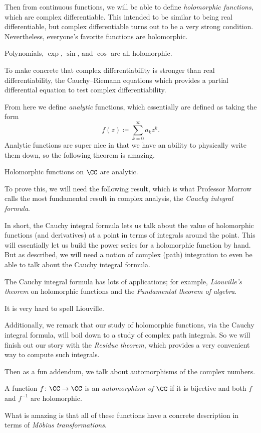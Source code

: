 \documentclass[../notes.tex]{subfiles}
\begin{document}
Then from continuous functions, we will be able to define \textit{holomorphic functions}, which are complex differentiable. This intended to be similar to being real differentiable, but complex differentiable turns out to be a very strong condition. Nevertheless, everyone's favorite functions are holomorphic.
\begin{example}
	Polynomials, $\exp$, $\sin$, and $\cos$ are all holomorphic.
\end{example}
To make concrete that complex differentiability is stronger than real differentiability, the Cauchy--Riemann equations which provides a partial differential equation to test complex differentiability.

From here we define \textit{analytic} functions, which essentially are defined as taking the form
\[f(z)\coloneqq \sum_{k=0}^\infty a_kz^k.\]
Analytic functions are super nice in that we have an ability to physically write them down, so the following theorem is amazing.
\begin{theorem}
	Holomorphic functions on $\CC$ are analytic.
\end{theorem}
To prove this, we will need the following result, which is what Professor Morrow calls the most fundamental result in complex analysis, the \textit{Cauchy integral formula}.

In short, the Cauchy integral formula lets us talk about the value of holomorphic functions (and derivatives) at a point in terms of integrals around the point. This will essentially let us build the power series for a holomorphic function by hand. But as described, we will need a notion of complex (path) integration to even be able to talk about the Cauchy integral formula.

The Cauchy integral formula has lots of applications; for example, \textit{Liouville's theorem} on holomorphic functions and the \textit{Fundamental theorem of algebra}.
\begin{remark}
	It is very hard to spell Liouville.
\end{remark}
Additionally, we remark that our study of holomorphic functions, via the Cauchy integral formula, will boil down to a study of complex path integrals. So we will finish out our story with the \textit{Residue theorem}, which provides a very convenient way to compute such integrals.

Then as a fun addendum, we talk about automorphisms of the complex numbers.
\begin{definition}
	A function $f\colon\CC\to\CC$ is an \textit{automorphism of $\CC$} if it is bijective and both $f$ and $f^{-1}$ are holomorphic.
\end{definition}
\noindent What is amazing is that all of these functions have a concrete description in terms of \textit{M\"obius transformations}.
\end{document}
